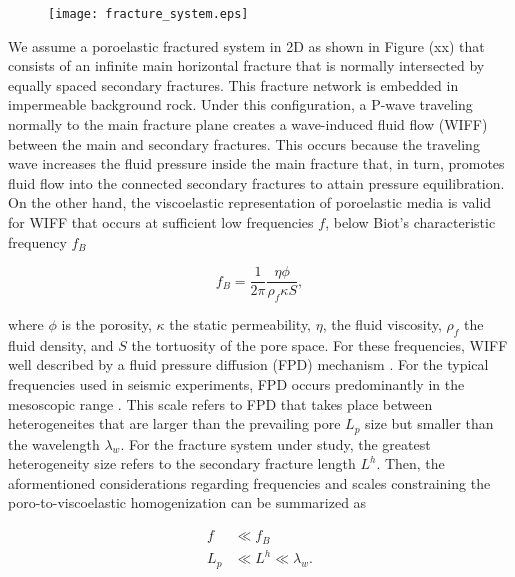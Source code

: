 \documentclass[draft]{agujournal2019}
\begin{document}
 \begin{figure}[!ht]
\centering
        \texttt{[image: fracture\_system.eps]}
\caption{
}
\label{fig.1}
\end{figure}
We assume a poroelastic fractured system in 2D as shown in Figure (xx)  that consists of an infinite main horizontal fracture that is normally intersected by equally spaced secondary fractures. This fracture network is embedded in impermeable background rock. Under this configuration, a P-wave traveling normally to the main fracture plane creates a wave-induced fluid flow (WIFF) between the main and secondary fractures. This occurs because the traveling wave increases the fluid pressure inside the main fracture that, in turn, promotes fluid flow into the connected secondary fractures to attain pressure equilibration. On the other hand, the viscoelastic representation of poroelastic media is valid for WIFF that occurs at sufficient low frequencies $f$, below Biot's characteristic frequency $f_B$  \cite{Biot1956, Dutta1979}
\begin{linenomath*}
\begin{equation}\label{Eq.1}
f_B= \frac{1}{2 \pi} \frac{\eta \phi}{ \rho_f \kappa S },
\end{equation}
\end{linenomath*}
where $\phi$ is the porosity, $\kappa$  the static permeability, $\eta$, the fluid viscosity,  $\rho_f$ the fluid density, and $S$ the tortuosity of the pore space. For these frequencies,  WIFF well described by a fluid pressure diffusion (FPD) mechanism \cite{Dutta1979, Chandler1981, Norris1993}.
For the typical frequencies used in seismic experiments, FPD occurs predominantly in the mesoscopic range \cite{Pride2004, Muller2010}. This scale refers to FPD that takes place between heterogeneites that are larger than the prevailing pore $L_p$ size but smaller than the wavelength $\lambda_w$. For the fracture system under study, the greatest heterogeneity size refers to the secondary fracture length $L^h$. Then, the aformentioned considerations regarding frequencies and scales constraining the poro-to-viscoelastic homogenization can be summarized as
\begin{linenomath*}
\begin{equation}\label{Eq.2}
\begin{split}
f & \ll f_B\\
L_p & \ll L^h\ll \lambda_w.
\end{split}
\end{equation}
\end{linenomath*}
\end{document}
